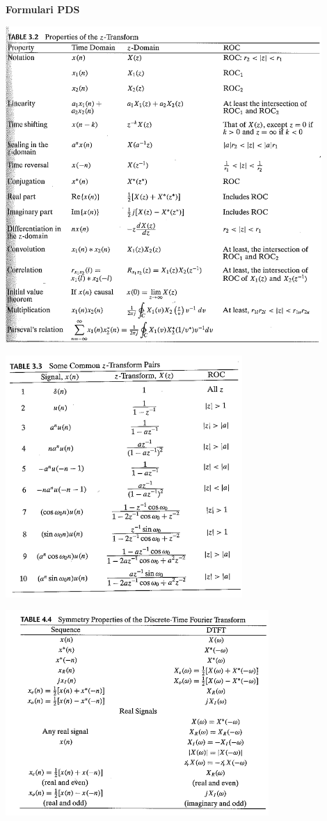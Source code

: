 \documentclass{article}
\begin{document}
\textbf{\Large Formulari PDS}

\begin{center}
\includegraphics[width=12cm]{tabpropTZ.png}
\end{center}

\begin{center}
\includegraphics[width=9cm]{TZhabituals.png}
\end{center}

\begin{center}
\includegraphics[width=10cm]{tabpropsimetria.png}
\end{center}
\end{document}
